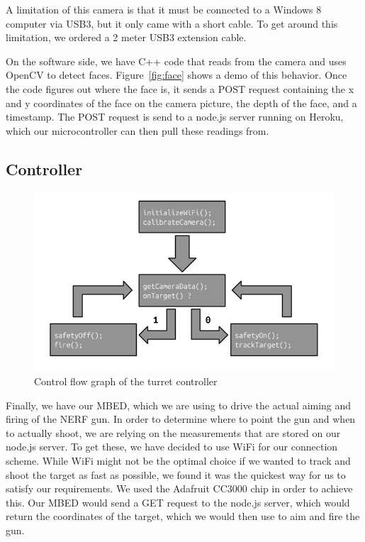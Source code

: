 \documentclass[journal]{IEEEtran}
\begin{document}
A limitation of this camera is that it must be connected to a Windows 8 computer via USB3, but it only came with a short cable. To get around this limitation, we ordered a 2 meter USB3 extension cable.

On the software side, we have C++ code that reads from the camera and uses OpenCV to detect faces. Figure~\ref{fig:face} shows a demo of this behavior. Once the code figures out where the face is, it sends a POST request containing the x and y coordinates of the face on the camera picture, the depth of the face, and a timestamp. The POST request is send to a node.js server running on Heroku, which our microcontroller can then pull these readings from.

\subsection{Controller}

\begin{figure}[htbp]
    \centering
    \includegraphics[width=1.0\linewidth]{controller_algo.png}
    \caption{Control flow graph of the turret controller}
    \label{fig:code}
\end{figure}

Finally, we have our MBED, which we are using to drive the actual aiming and firing of the NERF gun. In order to determine where to point the gun and when to actually shoot, we are relying on the measurements that are stored on our node.js server. To get these, we have decided to use WiFi for our connection scheme. While WiFi might not be the optimal choice if we wanted to track and shoot the target as fast as possible, we found it was the quickest way for us to satisfy our requirements. We used the Adafruit CC3000 chip in order to achieve this. Our MBED would send a GET request to the node.js server, which would return the coordinates of the target, which we would then use to aim and fire the gun.
\end{document}

